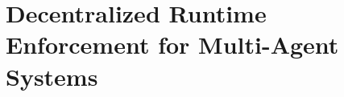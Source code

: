 

\newcommand*{\defeq}{\stackrel{\text{def}}{=}}
\newcommand{\Agents}{\mathcal{U}}
\newcommand{\Time}{\mathbb{T}}
\newcommand{\Actions}{\Sigma} 
\newcommand{\Elabel}{\mathcal{Y}}
\newcommand{\Vlabel}{\mathcal{X}}
\newcommand{\Bool}{\mathbb{B}}
\newcommand{\Safety}{\varphi}
\newcommand{\Lang}{\mathcal{L}}
\newcommand{\Power}{\mathcal{P}}
\newcommand{\Replace}{\mathcal{R}}
\newcommand\dhrightarrow{%
  \mathrel{\ooalign{$\rightarrow$\cr%
  $\mkern3.5mu\rightarrow$}}
}
\newcommand\dhxrightarrow[2][]{%
  \mathrel{\ooalign{$\xrightarrow[#1\mkern4mu]{#2\mkern4mu}$\cr%
  \hidewidth$\rightarrow\mkern4mu$}}
}

\newcommand{\Dj}[1]{\textcolor{blue}{#1}}
\newcommand{\suda}[1]{\textcolor{red}{#1}}

\newcommand\Square[1]{+(-#1,-#1) rectangle +(#1,#1)}

\chapter{Decentralized Runtime Enforcement for Multi-Agent Systems}%










